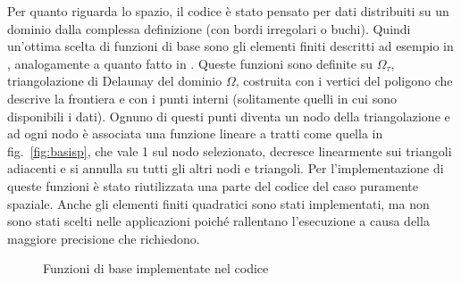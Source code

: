 \documentclass[a4paper,11pt,twoside,openright]{book}							%
\begin{document}
Per quanto riguarda lo spazio, il codice è stato pensato per dati distribuiti su un dominio dalla complessa definizione (con bordi irregolari o buchi). Quindi un'ottima scelta di funzioni di base sono gli elementi finiti descritti ad esempio in \cite{art:quarteroni}, analogamente a quanto fatto in \cite{art:sangalli}. Queste funzioni sono definite su $\Omega_{\tau}$, triangolazione di Delaunay del dominio $\Omega$, costruita con i vertici del poligono che descrive la frontiera e con i punti interni (solitamente quelli in cui sono disponibili i dati). Ognuno di questi punti diventa un nodo della triangolazione e ad ogni nodo è associata una funzione lineare a tratti come quella in fig.~\ref{fig:basisp}, che vale 1 sul nodo selezionato, decresce linearmente sui triangoli adiacenti e si annulla su tutti gli altri nodi e triangoli. Per l'implementazione di queste funzioni è stato riutilizzata una parte del codice del caso puramente spaziale. Anche gli elementi finiti quadratici sono stati implementati, ma non sono stati scelti nelle applicazioni poiché rallentano l'esecuzione a causa della maggiore precisione che richiedono.

\begin{figure}[t]
	\centering
	\caption{Funzioni di base implementate nel codice}
	\label{fig:basi}
\end{figure}
\end{document}
